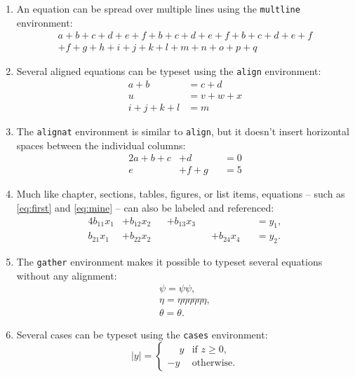 \documentclass[
  digital,     %
  twoside,     %
  lof,         %
  lot,         %
]{fithesis4}
\begin{document}
\begin{enumerate}
  \item An equation can be spread over multiple lines using the
    \texttt{multline} environment:
    \begin{multline}
      a + b + c + d + e + f + b + c + d + e + f + b + c + d + e +
f \\
      + f + g + h + i + j + k + l + m + n + o + p + q
    \end{multline}

  \item Several aligned equations can be typeset using the
    \texttt{align} environment:
    \begin{align}
              a + b &= c + d     \\
                  u &= v + w + x \\[1ex]
      i + j + k + l &= m
    \end{align}

  \item The \texttt{alignat} environment is similar to
    \texttt{align}, but it doesn't insert horizontal spaces between
    the individual columns:
    \begin{alignat}{2}
      a + b + c &+ d       &   &= 0 \\
              e &+ f + g   &   &= 5
    \end{alignat}

  \item Much like chapter, sections, tables, figures, or list
    items, equations -- such as \eqref{eq:first} and
    \eqref{eq:mine} -- can also be labeled and referenced:
    \begin{alignat}{4}
      b_{11}x_1 &+ b_{12}x_2  &  &+ b_{13}x_3  &  &             &
        &= y_1,                   \label{eq:first} \\
      b_{21}x_1 &+ b_{22}x_2  &  &             &  &+ b_{24}x_4  &
        &= y_2. \tag{My equation} \label{eq:mine}
    \end{alignat}

  \item The \texttt{gather} environment makes it possible to
    typeset several equations without any alignment:
    \begin{gather}
      \psi = \psi\psi, \\
      \eta = \eta\eta\eta\eta\eta\eta, \\
      \theta = \theta.
    \end{gather}

  \item Several cases can be typeset using the \texttt{cases}
    environment:
    \begin{equation}
      |y| = \begin{cases}
        \phantom-y & \text{if }z\geq0, \\
                -y & \text{otherwise}.
      \end{cases}
    \end{equation}
\end{enumerate}
\end{document}
